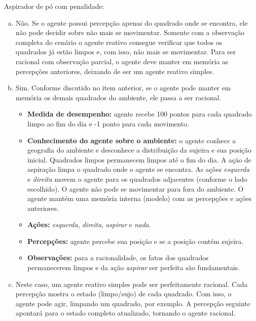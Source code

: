 \begin{solution}
Aspirador de pó com penalidade:
\begin{enumerate}[a.]
	\item Não. Se o agente possui percepção apenas do quadrado onde se encontra, ele não pode decidir sobre não mais se movimentar. Somente com a observação completa do cenário o agente reativo consegue verificar que todos os quadrados já estão limpos e, com isso, não mais se movimentar. Para ser racional com observação parcial, o agente deve manter em memória as percepções anteriores, deixando de ser um agente reativo simples.
	
	\item Sim. Conforme discutido no item anterior, se o agente pode manter em memória os demais quadrados do ambiente, ele passa a ser racional.
	\begin{itemize}
		\item \textbf{Medida de desempenho:} agente recebe 100 pontos para cada quadrado limpo ao fim do dia e -1 ponto para cada movimento.
		\item \textbf{Conhecimento do agente sobre o ambiente:} o agente conhece a geografia do ambiente e desconhece a distribuição da sujeira e sua posição inicial. Quadrados limpos permanecem limpos até o fim do dia. A ação de aspiração limpa o quadrado onde o agente se encontra. As ações \textit{esquerda} e \textit{direita} movem o agente para os quadrados adjacentes (conforme o lado escolhido). O agente não pode se movimentar para fora do ambiente. O agente mantém uma memória interna (modelo) com as percepções e ações anteriores.
		\item \textbf{Ações:} \textit{esquerda}, \textit{direita}, \textit{aspirar} e \textit{nada}.
		\item \textbf{Percepções:} agente percebe sua posição e se a posição contém sujeira.
		\item \textbf{Observações:} para a racionalidade, os fatos dos quadrados permanecerem limpos e da ação \textit{aspirar} ser perfeita são fundamentais.
	\end{itemize}
	
	\item Neste caso, um agente reativo simples pode ser perfeitamente racional. Cada percepção mostra o estado (limpo/sujo) de cada quadrado. Com isso, o agente pode agir, limpando um quadrado, por exemplo. A percepção seguinte apontará para o estado completo atualizado, tornando o agente racional.
\end{enumerate}
\end{solution}


